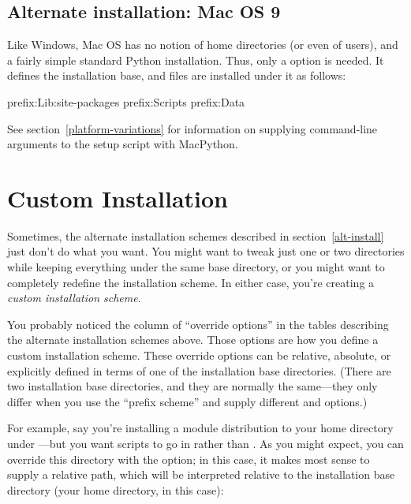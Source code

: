 \documentclass{howto}
\begin{document}
\subsection{Alternate installation: Mac OS 9}
\label{alt-install-macos}


Like Windows, Mac OS has no notion of home directories (or even of
users), and a fairly simple standard Python installation.  Thus, only a
 option is needed.  It defines the installation
base, and files are installed under it as follows:

              {prefix}{:Lib:site-packages}
              {prefix}{:Scripts}
              {prefix}{:Data}

See section~\ref{platform-variations} for information on supplying
command-line arguments to the setup script with MacPython.


\section{Custom Installation}
\label{custom-install}

Sometimes, the alternate installation schemes described in
section~\ref{alt-install} just don't do what you want.  You might
want to tweak just one or two directories while keeping everything under
the same base directory, or you might want to completely redefine the
installation scheme.  In either case, you're creating a \emph{custom
installation scheme}.

You probably noticed the column of ``override options'' in the tables
describing the alternate installation schemes above.  Those options are
how you define a custom installation scheme.  These override options can
be relative, absolute, or explicitly defined in terms of one of the
installation base directories.  (There are two installation base
directories, and they are normally the same---they only differ when you
use the \UNIX{} ``prefix scheme'' and supply different
 and  options.)

For example, say you're installing a module distribution to your home
directory under \UNIX---but you want scripts to go in
 rather than .
As you might expect, you can override this directory with the
 option; in this case, it makes most
sense to supply a relative path, which will be interpreted relative to
the installation base directory (your home directory, in this case):
\end{document}

